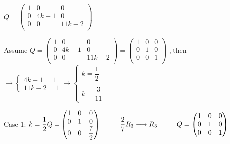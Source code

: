 \documentclass[fleqn]{article}
\begin{document}
\begin{enumerate}
      \textcolor{hwColor}{
        $
          Q=\begin{pmatrix}
          1 & 0 & 0 \\
          0 & 4k-1 & 0 \\
          0 & 0 & 11k-2 \\
        \end{pmatrix}
        $
      }

      \textcolor{hwColor}{
        Assume
        $
          Q=\begin{pmatrix}
          1 & 0 & 0 \\
          0 & 4k-1 & 0 \\
          0 & 0 & 11k-2 \\
        \end{pmatrix}=\begin{pmatrix}
          1 & 0 & 0 \\
          0 & 1 & 0 \\
          0 & 0 & 1 \\
        \end{pmatrix}
        $
        , then 
        $
         \longrightarrow
         \begin{cases}
           4k-1=1 \\
           11k-2=1  
         \end{cases}
         \longrightarrow
         \begin{cases}
           k=\dfrac{1}{2} \\
           \\
           k= \dfrac{3}{11} 
         \end{cases}
        $
      }

      \bigbreak

      \textcolor{hwColor}{
        Case 1: 
        $
           k=\dfrac{1}{2}
           \\
           Q=\begin{pmatrix}
             1 & 0 & 0 \\
             0 & 1 & 0 \\
             0 & 0 & \dfrac{7}{2}
           \end{pmatrix}
           \hspace{1cm} \dfrac{2}{7}R_3 \longrightarrow R_3
           \hspace{1cm} Q=\begin{pmatrix}
            1 & 0 & 0 \\
            0 & 1 & 0 \\
            0 & 0 & 1
           \end{pmatrix}
        $
      }


\end{enumerate}
\end{document}
